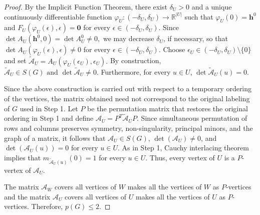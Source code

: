 \documentclass[10pt,a4paper]{amsart}
\begin{document}
\begin{proof}
By the Implicit Function Theorem, there exist \(\delta_U>0\) and a unique
continuously differentiable function
\(
\varphi_U:(-\delta_U,\delta_U)\longrightarrow\mathbb R^{|U|}
\)
such that
\(
\varphi_U(0)=\mathbf h^0
\)
and
\(
F_U(\varphi_U(\epsilon),\epsilon)=\mathbf 0
\)
for every \(\epsilon\in(-\delta_U,\delta_U)\).
Since
\(\det A_U(\mathbf h^0,0)=\det A_U^0\neq0,
\)
we may decrease \(\delta_U\), if necessary, so that
\(
\det A_U(\varphi_U(\epsilon),\epsilon)\neq0
\)
for every \(\epsilon\in(-\delta_U,\delta_U)\).
Choose
\(
\epsilon_U\in(-\delta_U,\delta_U)\setminus\{0\}
\)
and set
\(
\widetilde{\mathcal{A}}_U
=
A_U(\varphi_U(\epsilon_U),\epsilon_U).
\)
By construction,
\(
\widetilde{\mathcal{A}}_U\in S(G)
\text{ and }
\det\widetilde{\mathcal{A}}_U\neq0.
\)
Furthermore, for every \(u\in U\),
\(
\det\widetilde{\mathcal{A}}_U(u)=0.
\)

Since the above construction is carried out with respect to a temporary ordering of the vertices, the matrix obtained need not correspond to the original labeling of \(G\) used in Step 1. Let \(P\) be the permutation matrix that restores the original ordering in Step 1 and define
\(
\mathcal{A}_U=P^{T}\widetilde{\mathcal{A}}_U P.
\)
Since simultaneous permutation of rows and columns preserves symmetry, non-singularity, principal minors, and the graph of a matrix, it follows that \(\mathcal{A}_U\in S(G)\), \(\det(\mathcal{A}_U)\neq0\), and \(\det(\mathcal{A}_U(u))=0\) for every \(u\in U\).
As in Step 1, Cauchy interlacing theorem implies that
\(
m_{\widetilde{\mathcal{A}}_U(u)}(0)=1
\)
for every \(u\in U\). Thus, every vertex of \(U\) is a \(P\)-vertex
of \(\mathcal{A}_U\).

The matrix \(\mathcal A_W\) covers all vertices of \(W\) makes all the vertices of $W$ as $P$-vertices and the
matrix \(\mathcal A_U\) covers all vertices of \(U\) makes all the vertices of $U$ as $P$-vertices. Therefore,
\(
p(G)\leq2.
\) 

\end{proof}
\end{document}
